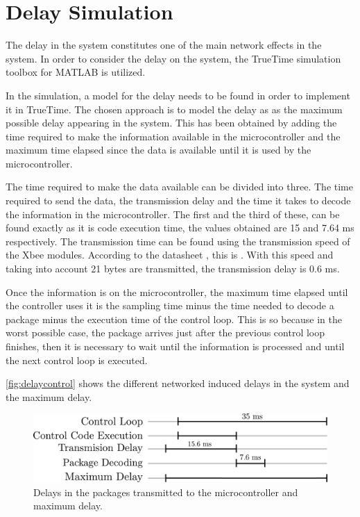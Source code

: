 \section{Delay Simulation}
The delay in the system constitutes one of the main network effects in the system. In order to consider the delay on the system, the TrueTime simulation toolbox for MATLAB is utilized. 

In the simulation, a model for the delay needs to be found in order to implement it in TrueTime. The chosen approach is to model the delay as as the maximum possible delay appearing in the system. This has been obtained by adding the time required to make the information available in the microcontroller and the maximum time elapsed since the data is available until it is used by the microcontroller. 

The time required to make the data available can be divided into three. The time required to send the data, the transmission delay and the time it takes to decode the information in the microcontroller. The first and the third of these, can be found exactly as it is code execution time, the values obtained are 15 and 7.64 ms respectively. The transmission time can be found using the transmission speed of the Xbee modules. According to the datasheet , this is . With this speed and taking into account 21 bytes are transmitted, the transmission delay is 0.6 ms.

Once the information is on the microcontroller, the maximum time elapsed until the controller uses it is the sampling time minus the time needed to decode a package minus the execution time of the control loop. This is so because in the worst possible case, the package arrives just after the previous control loop finishes, then it is necessary to wait until the information is processed and until the next control loop is executed. 

\autoref{fig:delaycontrol} shows the different networked induced delays in the system and the maximum delay. 
\begin{figure}[H]
	\centering
	\includegraphics[width=.6\textwidth]{figures/maxDelay.pdf}
	\caption{Delays in the packages transmitted to the microcontroller and maximum delay.}
	\label{fig:delaycontrol}
\end{figure}

